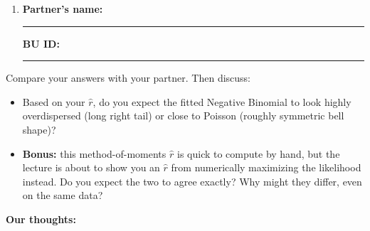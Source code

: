 \documentclass{article}
\newcommand{\nameblank}{\rule{1.75in}{0.4pt}}
\newcommand{\idblank}{\rule{1.55in}{0.4pt}}
\begin{document}
\begin{enumerate}[label=\arabic*.,leftmargin=*,itemsep=.7em, start=2]
  \item \textbf{Partner's name:} \nameblank \hfill \textbf{BU ID:} \idblank
\end{enumerate}

Compare your answers with your partner. Then discuss:

\begin{itemize}
  \item Based on your $\hat r$, do you expect the fitted Negative Binomial to look highly overdispersed (long right tail) or close to Poisson (roughly symmetric bell shape)?
  \item \textbf{Bonus:} this method-of-moments $\hat r$ is quick to compute by hand, but the lecture is about to show you an $\hat r$ from numerically maximizing the likelihood instead. Do you expect the two to agree exactly? Why might they differ, even on the same data?
\end{itemize}

\textbf{Our thoughts:}
\vfill
\end{document}
